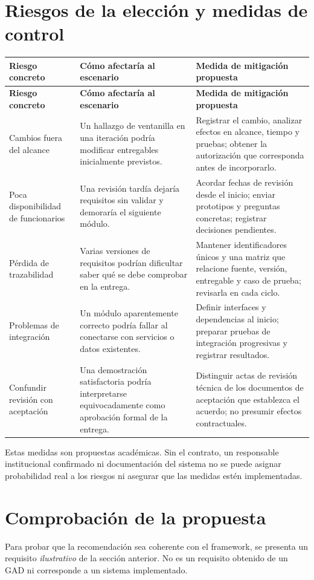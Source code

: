 \documentclass[10pt,a4paper,onecolumn]{IEEEtran}
\begin{document}
\section{Riesgos de la elección y medidas de control}
\small
\begin{longtable}{@{}p{3.10cm}p{5.40cm}p{7.40cm}@{}}
\toprule
\textbf{Riesgo concreto} & \textbf{Cómo afectaría al escenario} & \textbf{Medida de mitigación propuesta}\\
\midrule\endfirsthead
\toprule
\textbf{Riesgo concreto} & \textbf{Cómo afectaría al escenario} & \textbf{Medida de mitigación propuesta}\\
\midrule\endhead
Cambios fuera del alcance & Un hallazgo de ventanilla en una iteración podría modificar entregables inicialmente previstos. & Registrar el cambio, analizar efectos en alcance, tiempo y pruebas; obtener la autorización que corresponda antes de incorporarlo.\\
\midrule
Poca disponibilidad de funcionarios & Una revisión tardía dejaría requisitos sin validar y demoraría el siguiente módulo. & Acordar fechas de revisión desde el inicio; enviar prototipos y preguntas concretas; registrar decisiones pendientes.\\
\midrule
Pérdida de trazabilidad & Varias versiones de requisitos podrían dificultar saber qué se debe comprobar en la entrega. & Mantener identificadores únicos y una matriz que relacione fuente, versión, entregable y caso de prueba; revisarla en cada ciclo.\\
\midrule
Problemas de integración & Un módulo aparentemente correcto podría fallar al conectarse con servicios o datos existentes. & Definir interfaces y dependencias al inicio; preparar pruebas de integración progresivas y registrar resultados.\\
\midrule
Confundir revisión con aceptación & Una demostración satisfactoria podría interpretarse equivocadamente como aprobación formal de la entrega. & Distinguir actas de revisión técnica de los documentos de aceptación que establezca el acuerdo; no presumir efectos contractuales.\\
\midrule
\end{longtable}
\normalsize
Estas medidas son propuestas académicas. Sin el contrato, un responsable institucional confirmado ni documentación del sistema no se puede asignar probabilidad real a los riesgos ni asegurar que las medidas estén implementadas.


\section{Comprobación de la propuesta}
Para probar que la recomendación sea coherente con el framework, se presenta un requisito \emph{ilustrativo} de la sección anterior. No es un requisito obtenido de un GAD ni corresponde a un sistema implementado.
\end{document}
